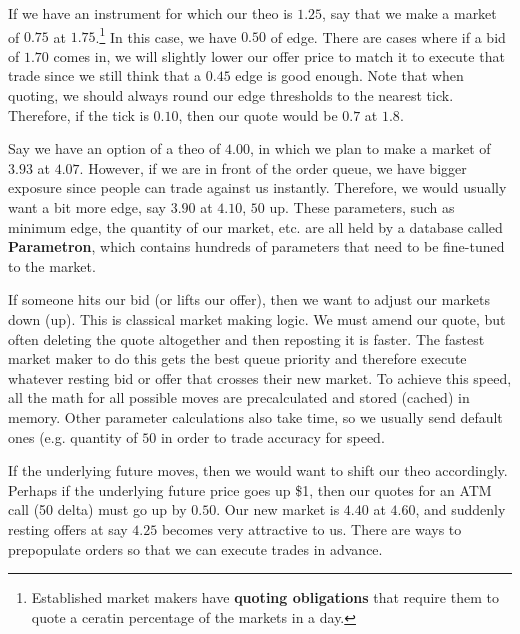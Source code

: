 \documentclass{article}
\begin{document}
    If we have an instrument for which our theo is $1.25$, say that we make a market of $0.75$ at $1.75$.\footnote{Established market makers have \textbf{quoting obligations} that require them to quote a ceratin percentage of the markets in a day.} In this case, we have $0.50$ of edge. There are cases where if a bid of $1.70$ comes in, we will slightly lower our offer price to match it to execute that trade since we still think that a $0.45$ edge is good enough. Note that when quoting, we should always round our edge thresholds to the nearest tick. Therefore, if the tick is $0.10$, then our quote would be $0.7$ at $1.8$.

    \begin{definition}[Quotes (AQ)]
      Say we have an option of a theo of $4.00$, in which we plan to make a market of $3.93$ at $4.07$. However, if we are in front of the order queue, we have bigger exposure since people can trade against us instantly. Therefore, we would usually want a bit more edge, say $3.90$ at $4.10$, $50$ up. These parameters, such as minimum edge, the quantity of our market, etc. are all held by a database called \textbf{Parametron}, which contains hundreds of parameters that need to be fine-tuned to the market.
    \end{definition}

    \begin{definition}
      If someone hits our bid (or lifts our offer), then we want to adjust our markets down (up). This is classical market making logic. We must amend our quote, but often deleting the quote altogether and then reposting it is faster. The fastest market maker to do this gets the best queue priority and therefore execute whatever resting bid or offer that crosses their new market. To achieve this speed, all the math for all possible moves are precalculated and stored (cached) in memory. Other parameter calculations also take time, so we usually send default ones (e.g. quantity of $50$ in order to trade accuracy for speed.
    \end{definition}

    \begin{definition}
      If the underlying future moves, then we would want to shift our theo accordingly. Perhaps if the underlying future price goes up \$1, then our quotes for an ATM call (50 delta) must go up by $0.50$. Our new market is $4.40$ at $4.60$, and suddenly resting offers at say $4.25$ becomes very attractive to us. There are ways to prepopulate orders so that we can execute trades in advance.
    \end{definition}
\end{document}
